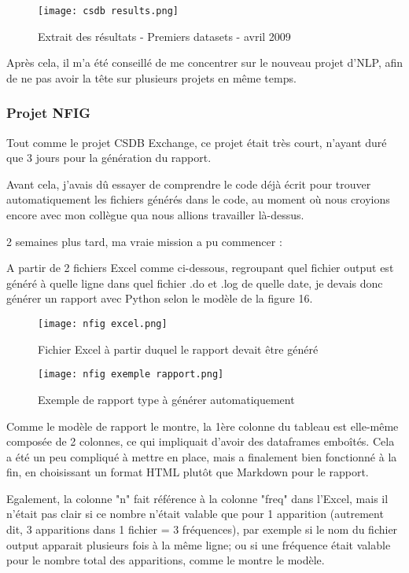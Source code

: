 \begin{figure}[H]
    \centering
    \texttt{[image: csdb results.png]}
    \caption{Extrait des résultats - Premiers datasets - avril 2009}
\end{figure}

Après cela, il m'a été conseillé de me concentrer sur le nouveau projet d'NLP, afin de ne pas avoir la tête sur plusieurs projets en même temps.

\pagebreak

\subsubsection{Projet NFIG}

Tout comme le projet CSDB Exchange, ce projet était très court, n'ayant duré que 3 jours pour la génération du rapport.

Avant cela, j'avais dû essayer de comprendre le code déjà écrit pour trouver automatiquement les fichiers générés dans le code, au moment où nous croyions encore avec mon collègue qua nous allions travailler là-dessus.

2 semaines plus tard, ma vraie mission a pu commencer : 

A partir de 2 fichiers Excel comme ci-dessous, regroupant quel fichier output est généré à quelle ligne dans quel fichier .do et .log de quelle date, je devais donc générer un rapport avec Python selon le modèle de la figure 16.

\begin{figure}[H]
    \centering
    \texttt{[image: nfig excel.png]}
    \caption{Fichier Excel à partir duquel le rapport devait être généré}
\end{figure}

\begin{figure}[H]
    \centering
    \texttt{[image: nfig exemple rapport.png]}
    \caption{Exemple de rapport type à générer automatiquement}
\end{figure}

Comme le modèle de rapport le montre, la 1ère colonne du tableau est elle-même composée de 2 colonnes, ce qui impliquait d'avoir des dataframes emboîtés.
Cela a été un peu compliqué à mettre en place, mais a finalement bien fonctionné à la fin, en choisissant un format HTML plutôt que Markdown pour le rapport.

Egalement, la colonne "n" fait référence à la colonne "freq" dans l'Excel, mais il n'était pas clair si ce nombre n'était valable que pour 1 apparition (autrement dit, 3 apparitions dans 1 fichier = 3 fréquences), par exemple si le nom du fichier output apparait plusieurs fois à la même ligne; 
ou si une fréquence était valable pour le nombre total des apparitions, comme le montre le modèle.

